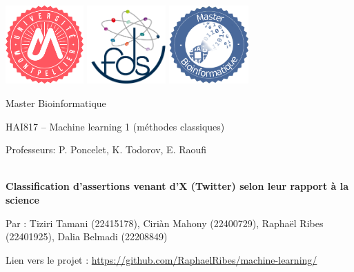 \documentclass[leqno]{article}[12pt]
\begin{document}
    \onehalfspace

    \begin{titlepage}
        \begin{center}
            \includegraphics[height=3cm]{images/logo_UM}\hspace{0.2\textwidth}
            \includegraphics[height=3cm]{images/logo_fds_rond}\hspace{0.2\textwidth}
            \includegraphics[height=3cm]{images/Logo_Bioinfo}

            {\Huge Master Bioinformatique\\[1cm]}

            {\large HAI817 -- Machine learning 1 (méthodes classiques)}\\[0.7cm]

            \begin{center}
                \large{Professeurs: P. Poncelet, K. Todorov, E. Raoufi}
            \end{center}

            \vspace{3.5cm}

            \hrulefill\\[0.4cm]
            {\fontsize{18}{22}\textbf{Classification d'assertions venant d’X (Twitter) selon leur rapport à la science}}\\[0.4cm]
            \hrulefill

            \vspace{1cm}
            {\large Par : Tiziri Tamani (22415178), Ciriàn Mahony (22400729), Raphaël Ribes (22401925), Dalia Belmadi (22208849)}

            \vspace{1cm}
            Lien vers le projet : \url{https://github.com/RaphaelRibes/machine-learning/}
        \end{center}
    \end{titlepage}
\end{document}
